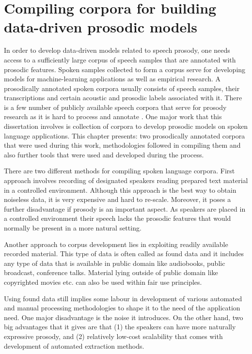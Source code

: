 \chapter{Compiling corpora for building data-driven prosodic models}
\label{chapter:corpusWorks}

In order to develop data-driven models related to speech prosody, one needs access to a sufficiently large corpus of speech samples that are annotated with prosodic features. Spoken samples collected to form a corpus serve for developing models for machine-learning applications as well as empirical research. A prosodically annotated spoken corpora usually consists of speech samples, their transcriptions and certain acoustic and prosodic labels associated with it. There is a few number of publicly available speech corpora that serve for prosody research as it is hard to process and annotate \citep{rosenberg}. One major work that this dissertation involves is collection of corpora to develop prosodic models on spoken language applications. This chapter presents: two prosodically annotated corpora that were used during this work, methodologies followed in compiling them and also further tools that were used and developed during the process.

There are two different methods for compiling spoken language corpora. First approach involves recording of designated speakers reading prepared text material in a controlled environment. Although this approach is the best way to obtain noiseless data, it is very expensive and hard to re-scale. Moreover, it poses a further disadvantage if prosody is an important aspect. As speakers are placed in a controlled environment their speech lacks the prosodic features that would normally be present in a more natural setting. 

Another approach to corpus development lies in exploiting readily available recorded material. This type of data is often called as found data and it includes any type of data that is available in public domain like audiobooks, public broadcast, conference talks. Material lying outside of public domain like copyrighted movies etc. can also be used within fair use principles. 

Using found data still implies some labour in development of various automated and manual processing methodologies to shape it to the need of the application need. One major disadvantage is the noise it introduces. On the other hand, two big advantages that it gives are that (1) the speakers can have more naturally expressive prosody, and (2) relatively low-cost scalability that comes with development of automated extraction methods. 

